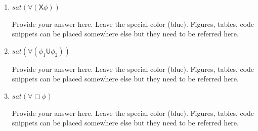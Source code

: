 \documentclass[12pt,a4paper]{article}
\begin{document}
\begin{description}
\begin{enumerate}[label=\alph*)]
\item $\mathit{sat}(\forall ( \mathsf{X} \phi))$
%
\ifwithanswers
\color{blue}
\par
Provide your answer here. Leave the special color (blue). Figures, tables, code snippets can be placed somewhere else but they need to be referred here.
\color{black}
\fi
%
\item $\mathit{sat}(\forall ( \phi_1 \mathsf{U} \phi_2))$
%
\ifwithanswers
\color{blue}
\par
Provide your answer here. Leave the special color (blue). Figures, tables, code snippets can be placed somewhere else but they need to be referred here.
\color{black}
\fi
%
\item $\mathit{sat}(\forall \Box \phi)$
%
\ifwithanswers
\color{blue}
\par
Provide your answer here. Leave the special color (blue). Figures, tables, code snippets can be placed somewhere else but they need to be referred here.
\color{black}
\fi
%
\end{enumerate}


\end{description}
\end{document}
